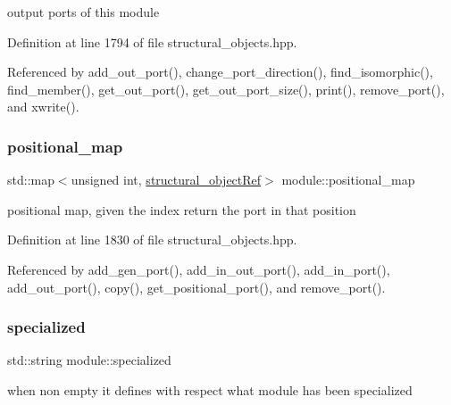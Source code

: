 output ports of this module 



Definition at line 1794 of file structural\+\_\+objects.\+hpp.



Referenced by add\+\_\+out\+\_\+port(), change\+\_\+port\+\_\+direction(), find\+\_\+isomorphic(), find\+\_\+member(), get\+\_\+out\+\_\+port(), get\+\_\+out\+\_\+port\+\_\+size(), print(), remove\+\_\+port(), and xwrite().

\mbox{\label{classmodule_a40509accacd208100d95e56667c94247}} 
\subsubsection{\texorpdfstring{positional\+\_\+map}{positional\_map}}
{\footnotesize\ttfamily std\+::map$<$unsigned int, \hyperlink{structural__objects_8hpp_a8ea5f8cc50ab8f4c31e2751074ff60b2}{structural\+\_\+object\+Ref}$>$ module\+::positional\+\_\+map\hspace{0.3cm}{\ttfamily [private]}}



positional map, given the index return the port in that position 



Definition at line 1830 of file structural\+\_\+objects.\+hpp.



Referenced by add\+\_\+gen\+\_\+port(), add\+\_\+in\+\_\+out\+\_\+port(), add\+\_\+in\+\_\+port(), add\+\_\+out\+\_\+port(), copy(), get\+\_\+positional\+\_\+port(), and remove\+\_\+port().

\mbox{\label{classmodule_a8b4418fa829899d9fe89122c85566433}} 
\subsubsection{\texorpdfstring{specialized}{specialized}}
{\footnotesize\ttfamily std\+::string module\+::specialized\hspace{0.3cm}{\ttfamily [private]}}



when non empty it defines with respect what module has been specialized 



